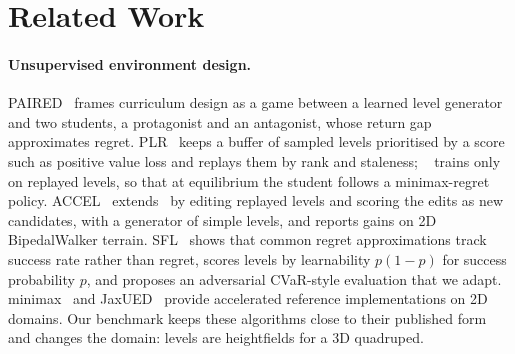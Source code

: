 \section{Related Work}
\label{sec:related}

\paragraph{Unsupervised environment design.}
PAIRED~\citep{dennis2020paired} frames curriculum design as a game between
a learned level generator and two students, a protagonist and an
antagonist, whose return gap approximates regret.
PLR~\citep{jiang2021plr} keeps a buffer of sampled levels prioritised by a
score such as positive value loss and replays them by rank and staleness;
\plr~\citep{jiang2021replay} trains only on replayed levels, so that at
equilibrium the student follows a minimax-regret policy.
ACCEL~\citep{parkerholder2022accel} extends \plr\ by editing replayed
levels and scoring the edits as new candidates, with a generator of simple
levels, and reports gains on 2D BipedalWalker terrain.
SFL~\citep{rutherford2024noregrets} shows that common regret approximations
track success rate rather than regret, scores levels by learnability
$p(1-p)$ for success probability $p$, and proposes an adversarial
CVaR-style evaluation that we adapt.
minimax~\citep{jiang2023minimax} and JaxUED~\citep{coward2024jaxued}
provide accelerated reference implementations on 2D domains.
Our benchmark keeps these algorithms close to their published form and
changes the domain: levels are heightfields for a 3D quadruped.

